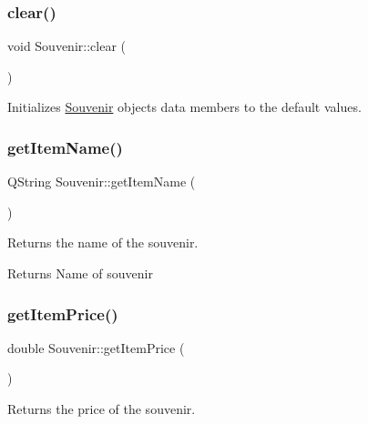 \subsubsection{\texorpdfstring{clear()}{clear()}}
{\footnotesize\ttfamily void Souvenir\+::clear (\begin{DoxyParamCaption}{ }\end{DoxyParamCaption})\hspace{0.3cm}{\ttfamily [inline]}}



Initializes \hyperlink{class_souvenir}{Souvenir} object\textquotesingle{}s data members to the default values. 

\mbox{\label{class_souvenir_a647d7608865447766758aed5d400fe0d}} 
\subsubsection{\texorpdfstring{get\+Item\+Name()}{getItemName()}}
{\footnotesize\ttfamily Q\+String Souvenir\+::get\+Item\+Name (\begin{DoxyParamCaption}{ }\end{DoxyParamCaption})\hspace{0.3cm}{\ttfamily [inline]}}



Returns the name of the souvenir. 

\begin{DoxyReturn}{Returns}
Name of souvenir 
\end{DoxyReturn}
\mbox{\label{class_souvenir_a8d88c94653047ed0d35141c3b465eae3}} 
\subsubsection{\texorpdfstring{get\+Item\+Price()}{getItemPrice()}}
{\footnotesize\ttfamily double Souvenir\+::get\+Item\+Price (\begin{DoxyParamCaption}{ }\end{DoxyParamCaption})\hspace{0.3cm}{\ttfamily [inline]}}



Returns the price of the souvenir. 

